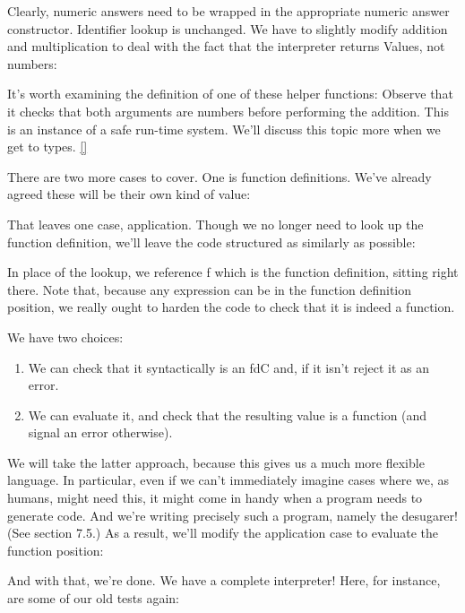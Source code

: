 
Clearly, numeric answers need to be wrapped in the appropriate numeric answer
constructor. Identifier lookup is unchanged. We have to slightly modify addition
and multiplication to deal with the fact that the interpreter returns Values,
not numbers:

It’s worth examining the definition of one of these helper functions:
Observe that it checks that both arguments are numbers before performing the
addition. This is an instance of a safe run-time system. We’ll discuss this
topic more when we get to types. \ref{}

There are two more cases to cover. One is function definitions. We’ve already
agreed these will be their own kind of value:

That leaves one case, application. Though we no longer need to look up the
function definition, we’ll leave the code structured as similarly as possible:

In place of the lookup, we reference f which is the function definition, sitting
right there. Note that, because any expression can be in the function definition
position, we really ought to harden the code to check that it is indeed a
function.


We have two choices:
\begin{enumerate}[nosep]
  \item 
We can check that it syntactically is an fdC and, if it isn’t reject it as an
error.
  \item 
We can evaluate it, and check that the resulting value is a function (and signal
an error otherwise).
\end{enumerate}
We will take the latter approach, because this gives us a much more flexible
language. In particular, even if we can’t immediately imagine cases where we, as
humans, might need this, it might come in handy when a program needs to generate
code. And we’re writing precisely such a program, namely the desugarer! (See
section 7.5.) As a result, we’ll modify the application case to evaluate the
function position:


And with that, we’re done. We have a complete interpreter! Here, for instance,
are some of our old tests again:
